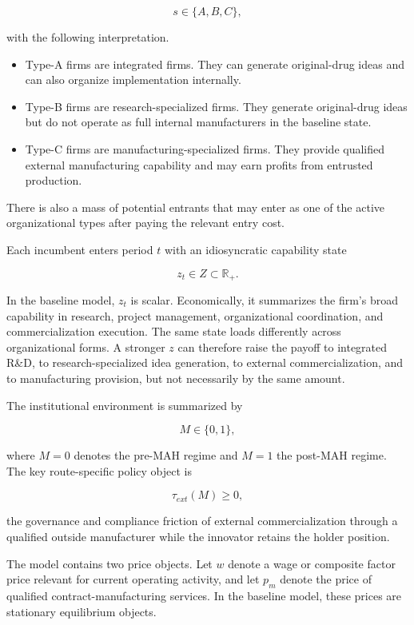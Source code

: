 \documentclass[12pt]{article}
\begin{document}
\[
s\in\{A,B,C\},
\]

with the following interpretation.

\begin{itemize}[nosep]
\item Type-A firms are integrated firms. They can generate original-drug ideas and can also organize implementation internally.

\item Type-B firms are research-specialized firms. They generate original-drug ideas but do not operate as full internal manufacturers in the baseline state.

\item Type-C firms are manufacturing-specialized firms. They provide qualified external manufacturing capability and may earn profits from entrusted production.
\end{itemize}

There is also a mass of potential entrants that may enter as one of the active organizational types after paying the relevant entry cost.

Each incumbent enters period $t$ with an idiosyncratic capability state

\[
z_t \in Z \subset \mathbb{R}_+.
\]

In the baseline model, $z_t$ is scalar. Economically, it summarizes the firm's broad capability in research, project management, organizational coordination, and commercialization execution. The same state loads differently across organizational forms. A stronger $z$ can therefore raise the payoff to integrated R\&D, to research-specialized idea generation, to external commercialization, and to manufacturing provision, but not necessarily by the same amount.

The institutional environment is summarized by

\[
M \in \{0,1\},
\]

where $M=0$ denotes the pre-MAH regime and $M=1$ the post-MAH regime. The key route-specific policy object is

\[
\tau_{ext}(M)\ge 0,
\]

the governance and compliance friction of external commercialization through a qualified outside manufacturer while the innovator retains the holder position.

The model contains two price objects. Let $w$ denote a wage or composite factor price relevant for current operating activity, and let $p_m$ denote the price of qualified contract-manufacturing services. In the baseline model, these prices are stationary equilibrium objects.
\end{document}
